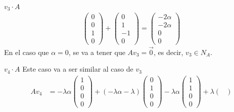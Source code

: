 \documentclass{article}
\begin{document}
\begin{enumerate}
\begin{mathcase}{\(v_3 \cdot A\)}
\[\begin{aligned}
\begin{pmatrix}
                        0 \\ 0 \\ 1 \\ 0
                    \end{pmatrix}
                    +
                    \begin{pmatrix}
                        0 \\ 1 \\ -1 \\ 0
                    \end{pmatrix} 
                    = 
                    \begin{pmatrix}
                        -2\alpha \\ -2\alpha \\ 0 \\ 0
                    \end{pmatrix}
                \end{aligned}
            \]
            En el caso que \(\alpha = 0\), se va a tener que \(Av_3 = \vec{0}\), 
            es decir, \(v_3 \in N_{A}\).
        \end{mathcase}
        \begin{mathcase}{\(v_4 \cdot A\)}
            Este caso va a ser similar al caso de \(v_3\)
            \[
                \begin{aligned}
                    Av_4 &= 
                    -\lambda\alpha
                    \begin{pmatrix}
                        1 \\ 0 \\ 0 \\ 0
                    \end{pmatrix}
                    +(-\lambda\alpha - \lambda)
                    \begin{pmatrix}
                        0 \\ 1 \\ 0 \\ 0
                    \end{pmatrix}
                    -\lambda\alpha
                    \begin{pmatrix}
                        1 \\ 1 \\ 0 \\ 0
                    \end{pmatrix}
                    +\lambda
                    \begin{pmatrix}

\end{pmatrix}
\end{aligned}\]
\end{mathcase}
\end{enumerate}
\end{document}

